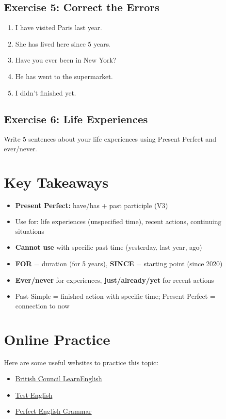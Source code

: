 \subsection{Exercise 5: Correct the Errors}
\begin{enumerate}
    \item I have visited Paris last year.
    \item She has lived here since 5 years.
    \item Have you ever been in New York?
    \item He has went to the supermarket.
    \item I didn't finished yet.
\end{enumerate}

\subsection{Exercise 6: Life Experiences}
Write 5 sentences about your life experiences using Present Perfect and ever/never.

\begin{tcolorbox}[colback=white,height=5cm]
\end{tcolorbox}

\section{Key Takeaways}
\begin{itemize}
    \item \textbf{Present Perfect:} have/has + past participle (V3)
    \item Use for: life experiences (unspecified time), recent actions, continuing situations
    \item \textbf{Cannot use} with specific past time (yesterday, last year, ago)
    \item \textbf{FOR} = duration (for 5 years), \textbf{SINCE} = starting point (since 2020)
    \item \textbf{Ever/never} for experiences, \textbf{just/already/yet} for recent actions
    \item Past Simple = finished action with specific time; Present Perfect = connection to now
\end{itemize}


\section{Online Practice}
Here are some useful websites to practice this topic:
\begin{itemize}
    \item \href{https://learnenglish.britishcouncil.org/grammar/b1-b2-grammar/present-perfect-simple-continuous}{British Council LearnEnglish}
    \item \href{https://test-english.com/grammar-points/b1/present-perfect-simple-continuous/}{Test-English}
    \item \href{https://www.perfect-english-grammar.com/present-perfect-continuous-exercise-1.html}{Perfect English Grammar}
\end{itemize}


